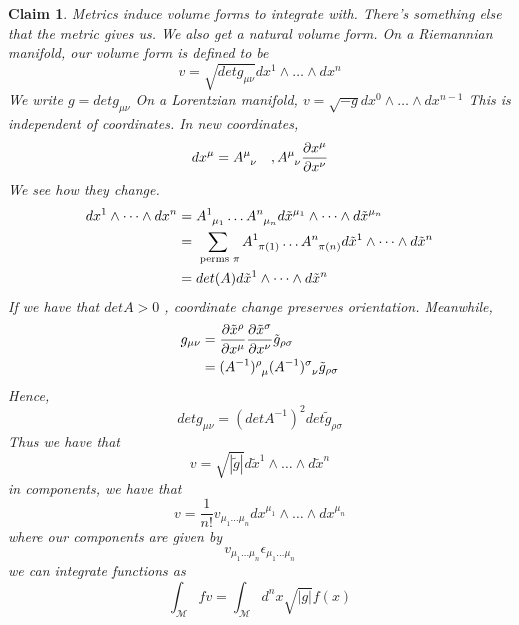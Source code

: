 \documentclass[11pt, a4paper]{article}   	%
\theoremstyle{slplain}
\newtheorem*{claim}{Claim}
\begin{document}
\begin{claim}{Metrics induce volume forms to integrate with.}
There's something else that the metric gives us. 
We also get a natural volume form. On a Riemannian manifold, our 
volume form is defined to be 
\[
v = \sqrt{ det g_{ \mu \nu } }  dx^ 1 \wedge  \dots \wedge  dx^ n 
\] We write $ g = det g_{ \mu \nu }$
On a Lorentzian manifold, $ v = \sqrt{ - g }  dx^ 0  \wedge  \dots \wedge  dx^{ n- 1}$
This is independent of coordinates. 
In new coordinates, 
\[
dx ^ \mu = A \indices{ ^ \mu _ \nu } \quad, A \indices{ ^ \mu _ \nu } \frac{\partial x^ \mu }{\partial  x^ \nu }    
\] 
We see how they change. 
\begin{align*}
dx^ 1 \wedge  \dots \wedge  dx^ n & = A \indices{ ^ 1 _{ \mu _ 1 }} \dots A \indices{^ n _{ \mu _ n } } d \tilde{x} ^{ \mu _ 1} \wedge  \dots \wedge  d \tilde{x }^{ \mu _ n }   \\
				  &=  \sum_{ \text{ perms } \pi } A \indices{ ^ 1 _{ \pi ( 1)  } } \dots A \indices{ ^ n _{ \pi ( n ) } } d \tilde{x }^ 1 \wedge  \dots \wedge  d \tilde{x  }^ n      \\
		& = det ( A) d \tilde{x  }^ 1 \wedge  \dots \wedge  d \tilde{x } ^ n   
\end{align*} If we have that $ det A > 0 $ , coordinate change preserves 
orientation. 
Meanwhile, 
\begin{align*}
g_{ \mu \nu } &=  \frac{\partial  \tilde{x } ^ \rho  }{\partial  x ^ \mu }  \frac{\partial  \tilde{x } ^ \sigma  }{\partial  x^ \nu }  \tilde{ g }_{ \rho \sigma }  \\ 
       &=  ( A^{ - 1} ) \indices{ ^ \rho _  \mu } ( A ^{ - 1}) \indices{ ^ \sigma _ \nu } \tilde{g }_{ \rho \sigma }    \\
\end{align*} 
Hence, 
\[
det g _{ \mu \nu } = ( det A^{ - 1} ) ^ 2 det \tilde{ g } _{ \rho \sigma } 
\] Thus we have that 
\[
v = \sqrt{ | \tilde{ g } |  } d \tilde{x }^ 1 \wedge  \dots \wedge  d \tilde{ x }^ n    
\] in components, 
we have that 
\[
v = \frac{1}{ n ! } v_{ \mu_1 \dots \mu_ n } dx^{ \mu _ 1 } \wedge  \dots \wedge  dx^{ \mu _ n }
\] where our components are given by 
\[
v _{ \mu _ 1 \dots \mu _ n } \epsilon_{ \mu _ 1 \dots \mu _ n }
\] we can integrate functions as 
\[
\int_{ \mathcal{ M } } fv = \int_{ \mathcal{ M } } d^ n x \sqrt{ | g | } f (x)  
\] 


\end{claim}
\end{document}
